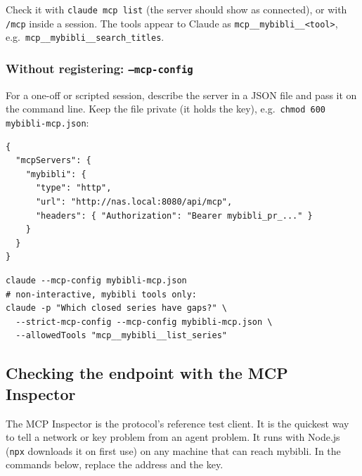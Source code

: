 Check it with \texttt{claude mcp list} (the server should show as
connected), or with \texttt{/mcp} inside a session. The tools appear
to Claude as \texttt{mcp\_\_mybibli\_\_<tool>}, e.g.\
\texttt{mcp\_\_mybibli\_\_search\_titles}.

\subsubsection*{Without registering: \texttt{--mcp-config}}

For a one-off or scripted session, describe the server in a JSON file
and pass it on the command line. Keep the file private (it holds the
key), e.g.\ \texttt{chmod 600 mybibli-mcp.json}:

\begin{lstlisting}
{
  "mcpServers": {
    "mybibli": {
      "type": "http",
      "url": "http://nas.local:8080/api/mcp",
      "headers": { "Authorization": "Bearer mybibli_pr_..." }
    }
  }
}
\end{lstlisting}

\begin{lstlisting}
claude --mcp-config mybibli-mcp.json
# non-interactive, mybibli tools only:
claude -p "Which closed series have gaps?" \
  --strict-mcp-config --mcp-config mybibli-mcp.json \
  --allowedTools "mcp__mybibli__list_series"
\end{lstlisting}

\subsection{Checking the endpoint with the MCP Inspector}
\label{sec:agents-inspector}

The MCP Inspector is the protocol's reference test client. It is the
quickest way to tell a network or key problem from an agent problem.
It runs with Node.js (\texttt{npx} downloads it on first use) on any
machine that can reach mybibli. In the commands below, replace the
address and the key.

